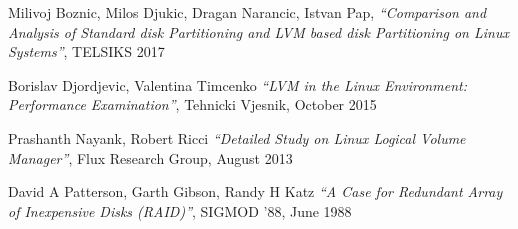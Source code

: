 \begin{thebibliography}{99}

    Milivoj Boznic, Milos Djukic, Dragan Narancic, Istvan Pap,
    \textit{``Comparison and Analysis of Standard disk Partitioning and LVM
    based disk Partitioning on Linux Systems''}, TELSIKS 2017

    Borislav Djordjevic, Valentina Timcenko
    \textit{``LVM in the Linux Environment: Performance Examination''},
    Tehnicki Vjesnik, October 2015

    Prashanth Nayank, Robert Ricci
    \textit{``Detailed Study on Linux Logical Volume Manager''},
    Flux Research Group, August 2013

    David A Patterson, Garth Gibson, Randy H Katz
    \textit{``A Case for Redundant Array of Inexpensive Disks (RAID)''},
    SIGMOD '88, June 1988 

\end{thebibliography}

